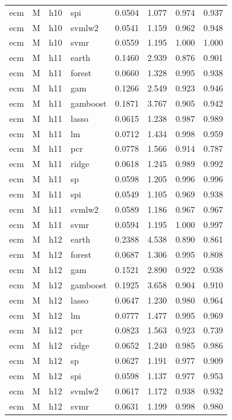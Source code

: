 \begin{ThreePartTable}
\begin{longtable}[t]{llclcccc}
ecm & M & h10 & spi & 0.0504 & 1.077 & 0.974 & 0.937\\
ecm & M & h10 & svmlw2 & 0.0541 & 1.159 & 0.962 & 0.948\\
ecm & M & h10 & svmr & 0.0559 & 1.195 & 1.000 & 1.000\\
\addlinespace
ecm & M & h11 & earth & 0.1460 & 2.939 & 0.876 & 0.901\\
ecm & M & h11 & forest & 0.0660 & 1.328 & 0.995 & 0.938\\
ecm & M & h11 & gam & 0.1266 & 2.549 & 0.923 & 0.946\\
ecm & M & h11 & gamboost & 0.1871 & 3.767 & 0.905 & 0.942\\
ecm & M & h11 & lasso & 0.0615 & 1.238 & 0.987 & 0.989\\
ecm & M & h11 & lm & 0.0712 & 1.434 & 0.998 & 0.959\\
ecm & M & h11 & pcr & 0.0778 & 1.566 & 0.914 & 0.787\\
ecm & M & h11 & ridge & 0.0618 & 1.245 & 0.989 & 0.992\\
ecm & M & h11 & sp & 0.0598 & 1.205 & 0.996 & 0.996\\
ecm & M & h11 & spi & 0.0549 & 1.105 & 0.969 & 0.938\\
ecm & M & h11 & svmlw2 & 0.0589 & 1.186 & 0.967 & 0.967\\
ecm & M & h11 & svmr & 0.0594 & 1.195 & 1.000 & 0.997\\
\addlinespace
ecm & M & h12 & earth & 0.2388 & 4.538 & 0.890 & 0.861\\
ecm & M & h12 & forest & 0.0687 & 1.306 & 0.995 & 0.808\\
ecm & M & h12 & gam & 0.1521 & 2.890 & 0.922 & 0.938\\
ecm & M & h12 & gamboost & 0.1925 & 3.658 & 0.904 & 0.910\\
ecm & M & h12 & lasso & 0.0647 & 1.230 & 0.980 & 0.964\\
ecm & M & h12 & lm & 0.0777 & 1.477 & 0.995 & 0.969\\
ecm & M & h12 & pcr & 0.0823 & 1.563 & 0.923 & 0.739\\
ecm & M & h12 & ridge & 0.0652 & 1.240 & 0.985 & 0.986\\
ecm & M & h12 & sp & 0.0627 & 1.191 & 0.977 & 0.909\\
ecm & M & h12 & spi & 0.0598 & 1.137 & 0.977 & 0.953\\
ecm & M & h12 & svmlw2 & 0.0617 & 1.172 & 0.938 & 0.932\\
ecm & M & h12 & svmr & 0.0631 & 1.199 & 0.998 & 0.980\\

\end{longtable}
\end{ThreePartTable}
